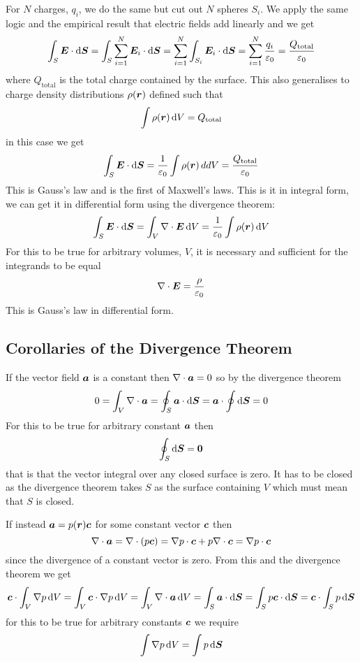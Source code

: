 \documentclass{article}
\begin{document}
    For \(N\) charges, \(q_i\), we do the same but cut out \(N\) spheres \(S_i\).
    We apply the same logic and the empirical result that electric fields add linearly and we get
    \[\int_S\bm{E}\cdot\dd\bm{S} = \int_S\sum_{i = 1}^N\bm{E}_i\cdot\dd\bm{S} = \sum_{i = 1}^N\int_{S_i}\bm{E}_i\cdot\dd\bm{S} = \sum_{i = 1}^N\frac{q_i}{\varepsilon_0} = \frac{Q_\text{total}}{\varepsilon_0}\]
    where \(Q_\text{total}\) is the total charge contained by the surface.
    This also generalises to charge density distributions \(\rho(\bm{r})\) defined such that
    \[\int\rho(\bm{r})\,\dd V = Q_\text{total}\]
    in this case we get
    \[\int_S\bm{E}\cdot\dd\bm{S} = \frac{1}{\varepsilon_0}\int\rho(\bm{r})\,dd V = \frac{Q_\text{total}}{\varepsilon_0}\]
    This is Gauss's law and is the first of Maxwell's laws.
    This is it in integral form, we can get it in differential form using the divergence theorem:
    \[\int_S\bm{E}\cdot\dd\bm{S} = \int_V\nabla\cdot\bm{E}\,\dd V = \frac{1}{\varepsilon_0}\int\rho(\bm{r})\,\dd V\]
    For this to be true for arbitrary volumes, \(V\), it is necessary and sufficient for the integrands to be equal
    \[\nabla\cdot\bm{E} = \frac{\rho}{\varepsilon_0}\]
    This is Gauss's law in differential form.
    
    \subsection{Corollaries of the Divergence Theorem}
    If the vector field \(\bm{a}\) is a constant then \(\nabla\cdot\bm{a} = 0\) so by the divergence theorem
    \[0 = \int_V\nabla\cdot\bm{a} = \oint_S\bm{a}\cdot\dd\bm{S} = \bm{a}\cdot\oint\dd\bm{S} = 0\]
    For this to be true for arbitrary constant \(\bm{a}\) then
    \[\oint_S\dd\bm{S} = \bm{0}\]
    that is that the vector integral over any closed surface is zero.
    It has to be closed as the divergence theorem takes \(S\) as the surface containing \(V\) which must mean that \(S\) is closed.
    
    If instead \(\bm{a} = p(\bm{r})\bm{c}\) for some constant vector \(\bm{c}\) then
    \[\nabla\cdot\bm{a} = \nabla\cdot(p\bm{c}) = \nabla p\cdot\bm{c} + p\nabla\cdot\bm{c} = \nabla p\cdot\bm{c}\]
    since the divergence of a constant vector is zero.
    From this and the divergence theorem we get
    \[\bm{c}\cdot\int_V\nabla p\,\dd V = \int_V\bm{c}\cdot\nabla p\,\dd V = \int_V\nabla\cdot\bm{a}\,\dd V = \int_S\bm{a}\cdot\dd\bm{S} = \int_Sp\bm{c}\cdot\dd\bm{S} = \bm{c}\cdot\int_S p\,\dd\bm{S}\]
    for this to be true for arbitrary constants \(\bm{c}\) we require
    \[\int\nabla p\,\dd V = \int p\,\dd\bm{S}\]
    
\end{document}
